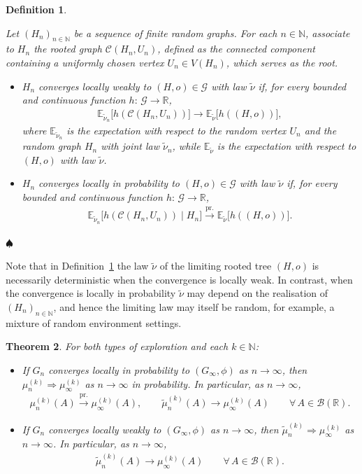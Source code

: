 \documentclass[11pt]{article}
\numberwithin{equation}{section}
\theoremstyle{plain}
\newtheorem{theorem}{Theorem}[section]
\newtheorem{definition}[theorem]{Definition}
\newcommand{\N}{\mathbb N}
\newcommand{\R}{\mathbb R}
\newcommand{\prob}{\overset{\mathrm{pr.}}{\longrightarrow}}
\newcommand{\weak}{\Longrightarrow}
\newcommand{\E}{\mathbb E}
\begin{document}
\begin{definition}
\label{deflc}
{\rm Let $(H_{n})_{n\in\N}$ be a sequence of finite random graphs. 
For each $n\in\N$, associate to $H_{n}$ the rooted graph $\mathscr{C}(H_{n},U_{n})$, defined as the connected component containing a uniformly chosen vertex $U_{n}\in V(H_{n})$, which serves as the root.
\begin{itemize}
\item[(a)] 
$H_{n}$ converges \emph{locally weakly} to $(H,o)\in \mathscr{G}$ with law $\tilde{\nu}$ if, for every bounded and continuous function $h\colon\,\mathscr{G}\to\R$,
\begin{align*}
	\E_{\tilde{\nu}_{n}}\big[h(\mathscr{C}(H_{n} ,U_{n}))\big] \to \E_{\tilde{\nu}}\big[h((H,o))\big],
\end{align*}
where $\E_{\tilde{\nu}_{n}}$ is the expectation with respect to the random vertex $U_{n}$ and the random graph $H_{n}$ with joint law $\tilde{\nu}_{n}$, while $\E_{\tilde{\nu}}$ is the expectation with respect to $(H, o)$ with law $\tilde{\nu}$.
\item[(b)] 
$H_{n}$ converges \emph{locally in probability} to $(H,o)\in \mathscr{G}$ with law $\tilde{\nu}$ if, for every bounded and continuous function $h\colon\,\mathscr{G}\to\R$,
\begin{align*}
	\E_{\tilde{\nu}_{n}}\big[h(\mathscr{C}(H_{n} ,U_{n})) \mid H_{n}\big] \prob\E_{\tilde{\nu}}\big[h((H,o))\big].
\end{align*}
\end{itemize}
}\hfill$\spadesuit$
\end{definition}

\noindent
Note that in Definition~\ref{deflc} the law $\tilde{\nu}$ of the limiting rooted tree $(H,o)$ is necessarily deterministic when the convergence is locally weak. In contrast, when the convergence is locally in probability $\tilde{\nu}$ may depend on the realisation of $(H_{n})_{n\in\N}$, and hence the limiting law may itself be random, for example, a mixture of random environment settings.


\begin{theorem}
\label{thm1}
For both types of exploration and each $k\in\N$:
\begin{itemize}
\item[\rm{(a)}] 
If $G_{n}$ converges locally in probability to $(G_{\infty},\phi)$ as $n\to\infty$, then $\mu_{n}^{(k)} \weak \mu^{(k)}_{\infty}$ as $n\to\infty$ in probability. In particular, as $n\to\infty$,
\begin{align*}
\mu_{n}^{(k)} (A) \prob \mu^{(k)}_{\infty} (A), \qquad 
\tilde{\mu}_{n}^{(k)} (A) \to \mu^{(k)}_{\infty} (A) \qquad \forall\,A \in \mathcal{B}(\R).
\end{align*}
\item[\rm{(b)}] 
If $G_{n}$ converges locally weakly to $(G_{\infty},\phi)$ as $n\to\infty$, then $\tilde{\mu}_{n}^{(k)} \weak \mu^{(k)}_{\infty}$ as $n\to\infty$. In particular, as $n\to\infty$,
\begin{align*}
\tilde{\mu}_{n}^{(k)} (A) \to \mu^{(k)}_{\infty} (A) \qquad \forall\,A \in \mathcal{B}(\R).
\end{align*}
\end{itemize}
\end{theorem}
\end{document}
